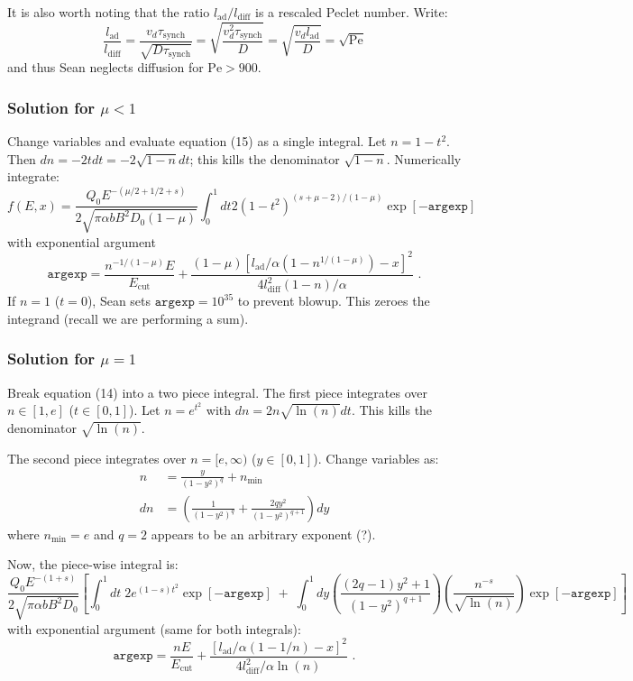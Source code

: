 \documentclass[10pt]{article}
\newcommand{\mt}{\mathrm}
\begin{document}
It is also worth noting that the ratio $l_{\mt{ad}} / l_{\mt{diff}}$ is a
rescaled Peclet number.  Write:
\[
    \frac{l_{\mt{ad}}}{l_{\mt{diff}}}
    = \frac{ v_d \tau_{\mt{synch}} }{ \sqrt{D \tau_{\mt{synch}}} }
    = \sqrt{ \frac{ v_d^2 \tau_{\mt{synch}} }{ D } }
    = \sqrt{ \frac{ v_d l_{\mt{ad}} }{ D } }
    = \sqrt{\mt{Pe}}
\]
and thus Sean neglects diffusion for $\mt{Pe} > 900$.


\subsubsection{Solution for \texorpdfstring{$\mu < 1$}{mu lt 1}}
Change variables and evaluate equation (15) as a single integral.
Let $n = 1 - t^2$. Then $dn = -2t dt = -2\sqrt{1-n}dt$;
this kills the denominator $\sqrt{1-n}$.  Numerically integrate:
\[
    f(E,x) = \frac{Q_0 E^{-(\mu/2 + 1/2 + s)}}
            {2 \sqrt{\pi \alpha b B^2 D_0 (1-\mu)}} 
            \int_0^1 dt 2 (1-t^2)^{ (s+\mu-2) / (1-\mu) }
            \exp[ - \mathtt{argexp} ]
\]
with exponential argument
\[
    \mathtt{argexp} = \frac{n^{-1/(1-\mu)} E}{E_{\mt{cut}}}
    + \frac{(1 - \mu)
        \left[ l_{\mt{ad}}/\alpha \left(1 - n^{1/(1-\mu)}\right) - x \right]^2}
        {4 l_{\mt{diff}}^2 (1-n) / \alpha}
    \text{ .}
\]
If $n=1$ ($t=0$), Sean sets $\mathtt{argexp} = 10^{35}$ to prevent blowup.
This zeroes the integrand (recall we are performing a sum).


\subsubsection{Solution for \texorpdfstring{$\mu = 1$}{mu eq 1}}
Break equation (14) into a two piece integral.
The first piece integrates over $n\in [1,e]$ ($t\in[0,1]$).
Let $n = e^{t^2}$ with $dn = 2 n \sqrt{\ln(n)} dt$.
This kills the denominator $\sqrt{\ln(n)}$.

The second piece integrates over $n=[e,\infty)$ ($y\in[0,1]$).
Change variables as:
\begin{align*}
    n &= \frac{y}{(1-y^2)^q} + n_{\mt{min}} \\
    dn &= \left( \frac{1}{(1-y^2)^q} + \frac{2qy^2}{(1 - y^2)^{q+1}} \right) dy
\end{align*}
where $n_{\mt{min}} = e$ and $q = 2$ appears to be an arbitrary exponent (?).

Now, the piece-wise integral is:
\[
    \frac{Q_0 E^{-(1+s)}}
         { 2 \sqrt{ \pi \alpha b B^2 D_0 } }
    \left[
        \int_0^1 dt \; 2 e^{(1-s) t^2} \exp[ - \mathtt{argexp} ]
        \; + \;
        \int_0^1 dy \left(\frac{(2q-1) y^2 + 1}{(1 - y^2)^{q+1}}\right)
                    \left(\frac{n^{-s}}{ \sqrt{\ln(n)} }\right)
                    \exp[ - \mathtt{argexp} ]
    \right]
\]
with exponential argument (same for both integrals):
\[
    \mathtt{argexp} = \frac{n E}{E_{\mt{cut}}}
        + \frac{ \left[ l_{\mt{ad}}/\alpha (1 - 1/n) - x \right]^2 }
        { 4 l_{\mt{diff}}^2 /\alpha \ln(n) }
    \text{ .}
\]
\end{document}
